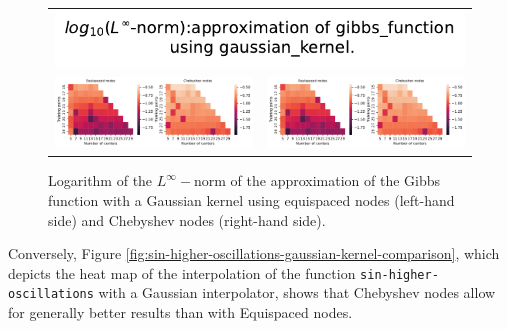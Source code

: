 \documentclass[12pt]{report} %
\begin{document}
\begin{figure}[h]
  \begin{tabular}{cc}
    \multicolumn{2}{c}{{\includegraphics[width=.5\textwidth]
    {imagenes/experiments/1d/variational/linf_gibbs_function_gaussian_kernel_Points_Title.pdf}}}                                                                                       \\
    {\includegraphics[height=.4\textwidth, trim={0 0 11.8cm 0},clip=true]
    {imagenes/experiments/1d/variational/linf_gibbs_function_gaussian_kernel_Points_Comparison.pdf}}  &
     {\includegraphics[height=.4\textwidth, trim={9.8cm 0 0 0},clip=true]{imagenes/experiments/1d/variational/linf_gibbs_function_gaussian_kernel_Points_Comparison.pdf}} \\
  \end{tabular}
  \caption{Logarithm of the $L^\infty-$norm of the approximation of the Gibbs function with a Gaussian kernel using equispaced nodes (left-hand side) and Chebyshev nodes (right-hand side).}
  \label{fig:gibbs-function-gaussian-kernel-comparison-points-classic}
\end{figure}


Conversely, Figure \ref{fig:sin-higher-oscillations-gaussian-kernel-comparison}, which depicts the heat map of the interpolation of the function \texttt{sin-higher-oscillations} with a Gaussian interpolator, shows that Chebyshev nodes allow for generally better results than with Equispaced nodes.
\end{document}
